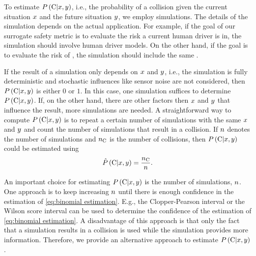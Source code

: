 To estimate $P\left(  \mathrm{C} | x, y  \right)$, i.e., the probability of a collision given the current situation $x$ and the future situation $y$, we employ simulations. 
The details of the simulation depends on the actual application. 
For example, if the goal of our surrogate safety metric is to evaluate the risk a current human driver is in, the simulation should involve human driver models. 
On the other hand, if the goal is to evaluate the risk of , the simulation should include the same .

If the result of a simulation only depends on $x$ and $y$, i.e., the simulation is fully deterministic and stochastic influences like sensor noise are not considered, then $P\left(  \mathrm{C} | x, y  \right)$ is either $0$ or $1$.
In this case, one simulation suffices to determine $P\left(  \mathrm{C} | x, y  \right)$.
If, on the other hand, there are other factors then $x$ and $y$ that influence the result, more simulations are needed.
A straightforward way to compute $P\left(  \mathrm{C} | x, y  \right)$ is to repeat a certain number of simulations with the same $x$ and $y$ and count the number of simulations that result in a collision.
If $n$ denotes the number of simulations and $n_{\mathrm{C}}$ is the number of collisions, then $P\left(  \mathrm{C} | x, y  \right)$ could be estimated using
\begin{equation}
	\label{eq:binomial estimation}
	\hat{P}\left(  \mathrm{C} | x, y  \right)
	= \frac{n_{\mathrm{C}}}{n}.
\end{equation}

An important choice for estimating $P\left(  \mathrm{C} | x, y  \right)$ is the number of simulations, $n$.
One approach is to keep increasing $n$ until there is enough confidence in the estimation of \cref{eq:binomial estimation}.
E.g., the Clopper-Pearson interval \autocite{clopper1934use} or the Wilson score interval \autocite{wilson1927probable} can be used to determine the confidence of the estimation of \cref{eq:binomial estimation}.
A disadvantage of this approach is that only the fact that a simulation results in a collision is used while the simulation provides more information. 
Therefore, we provide an alternative approach to estimate $P\left(  \mathrm{C} | x, y  \right)$.

